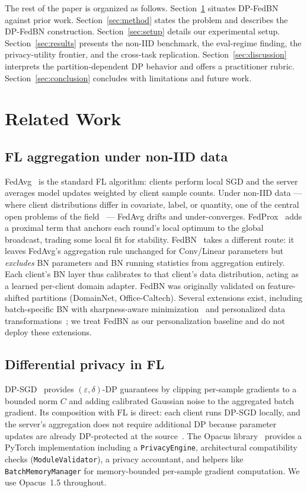 \documentclass[conference]{IEEEtran}
\newcommand{\code}[1]{\texttt{\small #1}}
\begin{document}
The rest of the paper is organized as follows. Section~\ref{sec:related} situates DP-FedBN against prior work. Section~\ref{sec:method} states the problem and describes the DP-FedBN construction. Section~\ref{sec:setup} details our experimental setup. Section~\ref{sec:results} presents the non-IID benchmark, the eval-regime finding, the privacy-utility frontier, and the cross-task replication. Section~\ref{sec:discussion} interprets the partition-dependent DP behavior and offers a practitioner rubric. Section~\ref{sec:conclusion} concludes with limitations and future work.

\section{Related Work}\label{sec:related}

\subsection{FL aggregation under non-IID data}
FedAvg~\cite{fedavg} is the standard FL algorithm: clients perform local SGD and the server averages model updates weighted by client sample counts. Under non-IID data --- where client distributions differ in covariate, label, or quantity, one of the central open problems of the field~\cite{kairouz} --- FedAvg drifts and under-converges. FedProx~\cite{fedprox} adds a proximal term that anchors each round's local optimum to the global broadcast, trading some local fit for stability. FedBN~\cite{fedbn} takes a different route: it leaves FedAvg's aggregation rule unchanged for Conv/Linear parameters but \emph{excludes} BN parameters and BN running statistics from aggregation entirely. Each client's BN layer thus calibrates to that client's data distribution, acting as a learned per-client domain adapter. FedBN was originally validated on feature-shifted partitions (DomainNet, Office-Caltech). Several extensions exist, including batch-specific BN with sharpness-aware minimization~\cite{tia} and personalized data transformations~\cite{privatefl}; we treat FedBN as our personalization baseline and do not deploy these extensions.

\subsection{Differential privacy in FL}
DP-SGD~\cite{abadi} provides $(\varepsilon,\delta)$-DP guarantees by clipping per-sample gradients to a bounded norm $C$ and adding calibrated Gaussian noise to the aggregated batch gradient. Its composition with FL is direct: each client runs DP-SGD locally, and the server's aggregation does not require additional DP because parameter updates are already DP-protected at the source~\cite{geyer}. The Opacus library~\cite{opacus} provides a PyTorch implementation including a \code{PrivacyEngine}, architectural compatibility checks (\code{ModuleValidator}), a privacy accountant, and helpers like \code{BatchMemoryManager} for memory-bounded per-sample gradient computation. We use Opacus~1.5 throughout.
\end{document}
